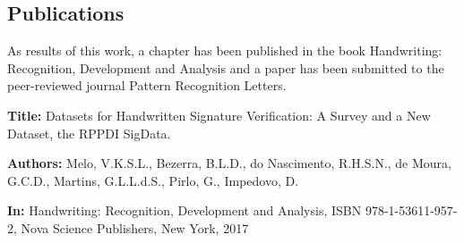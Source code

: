  \begin{apendicesenv}

\chapter{Publications}

As results of this work, a chapter has been published in the book Handwriting: Recognition, Development and Analysis and a paper has been submitted to the peer-reviewed journal Pattern Recognition Letters.

\textbf{Title:} Datasets for Handwritten Signature Verification: A Survey and a New Dataset, the RPPDI SigData.

\textbf{Authors:} Melo, V.K.S.L., Bezerra, B.L.D., do Nascimento, R.H.S.N., de Moura, G.C.D., Martins, G.L.L.d.S., Pirlo, G., Impedovo, D.

\textbf{In:} Handwriting: Recognition, Development and Analysis, ISBN 978-1-53611-957-2, Nova Science Publishers, New York, 2017


\end{apendicesenv}
